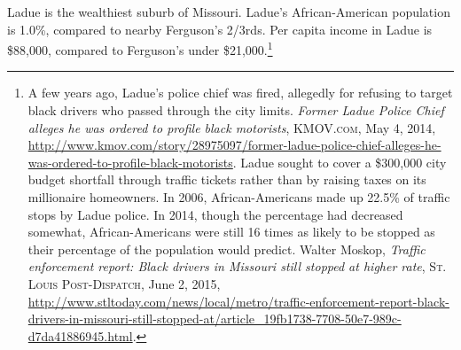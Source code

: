 Ladue is the wealthiest suburb of Missouri. Ladue's African-American population
is 1.0\%, compared to nearby Ferguson's 2/3rds. Per capita income in Ladue is
\$88,000, compared to Ferguson's under \$21,000.\footnote{A few years ago,
Ladue's police chief was fired, allegedly for refusing to target black drivers
who passed through the city limits. \emph{Former Ladue Police Chief alleges he
was ordered to profile black motorists}, \textsc{KMOV.com}, May 4, 2014,
\url{http://www.kmov.com/story/28975097/former-ladue-police-chief-alleges-he-was-ordered-to-profile-black-motorists}.
Ladue sought to cover a \$300,000 city budget shortfall through traffic tickets
rather than by raising taxes on its millionaire homeowners. In 2006,
African-Americans made up 22.5\% of traffic stops by Ladue police. In 2014,
though the percentage had decreased somewhat, African-Americans were still 16
times as likely to be stopped as their percentage of the population would
predict. Walter Moskop, \emph{Traffic enforcement report: Black drivers in
Missouri still stopped at higher rate}, \textsc{St. Louis Post-Dispatch}, June
2, 2015,
\url{http://www.stltoday.com/news/local/metro/traffic-enforcement-report-black-drivers-in-missouri-still-stopped-at/article_19fb1738-7708-50e7-989c-d7da41886945.html}.}


